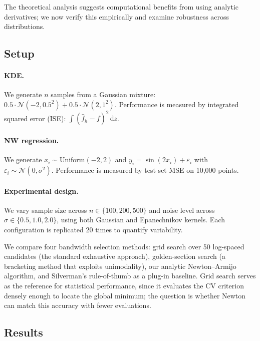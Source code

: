 \documentclass[11pt]{article}
\theoremstyle{definition}
\theoremstyle{remark}
\newcommand{\dd}{\mathrm{d}}
\begin{document}
The theoretical analysis suggests computational benefits from using analytic derivatives; we now verify this empirically and examine robustness across distributions.

\subsection{Setup}

\paragraph{KDE.}
We generate $n$ samples from a Gaussian mixture: $0.5 \cdot \mathcal{N}(-2, 0.5^2) + 0.5 \cdot \mathcal{N}(2, 1^2)$.
Performance is measured by integrated squared error (ISE): $\int (\hat{f}_h - f)^2 \, \dd z$.

\paragraph{NW regression.}
We generate $x_i \sim \text{Uniform}(-2, 2)$ and $y_i = \sin(2x_i) + \varepsilon_i$ with $\varepsilon_i \sim \mathcal{N}(0, \sigma^2)$.
Performance is measured by test-set MSE on 10,000 points.

\paragraph{Experimental design.}
We vary sample size across $n \in \{100, 200, 500\}$ and noise level across $\sigma \in \{0.5, 1.0, 2.0\}$, using both Gaussian and Epanechnikov kernels.
Each configuration is replicated 20 times to quantify variability.

We compare four bandwidth selection methods: grid search over 50 log-spaced candidates (the standard exhaustive approach), golden-section search (a bracketing method that exploits unimodality), our analytic Newton--Armijo algorithm, and Silverman's rule-of-thumb as a plug-in baseline.
Grid search serves as the reference for statistical performance, since it evaluates the CV criterion densely enough to locate the global minimum; the question is whether Newton can match this accuracy with fewer evaluations.

\subsection{Results}
\end{document}
